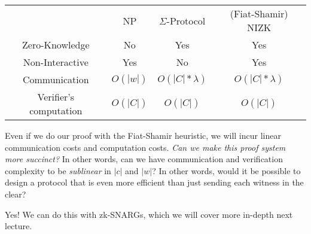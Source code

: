 \begin{center}
    \begin{tabular}{c|c|c|c}
        & NP & $\Sigma$-Protocol & (Fiat-Shamir) NIZK \\
        Zero-Knowledge & No & Yes & Yes\\
        Non-Interactive & Yes & No & Yes\\
        Communication & $O(|w|)$ & $O(|C|*\lambda)$ & $O(|C|*\lambda)$ \\
        Verifier's computation & $O(|C|)$ & $O(|C|)$ & $O(|C|)$ \\
    \end{tabular}
\end{center}

Even if we do our proof with the Fiat-Shamir heuristic, we will incur linear communication costs and computation costs. 
\emph{Can we make this proof system more succinct?} In other words, can we have communication and verification complexity to be \emph{sublinear} in $|c|$ and $|w|$? In other words, would it be possible to design a protocol that is even more efficient than just sending each witness in the clear?

Yes! We can do this with zk-SNARGs, which we will cover more in-depth next lecture.